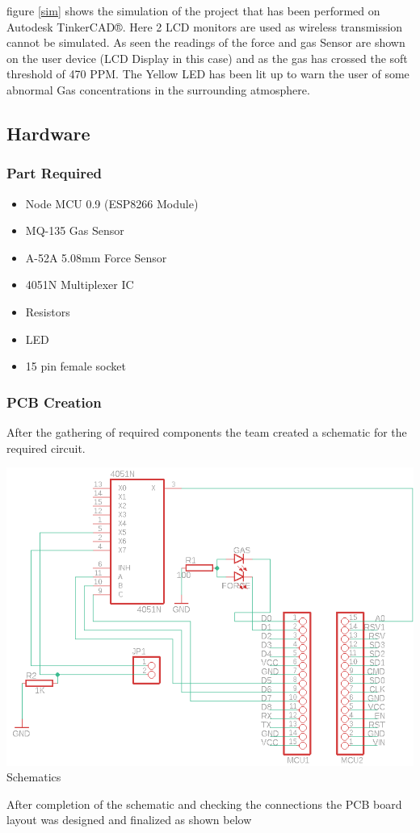 \documentclass[conference]{IEEEtran}
\newenvironment{Figure}
  {\par\medskip\noindent\minipage{\linewidth}}
  {\endminipage\par\medskip}
\begin{document}
figure \ref{sim} shows the simulation of the project that
has been performed on Autodesk TinkerCAD®. Here 2 LCD
monitors are used as wireless transmission cannot be
simulated. As seen the readings of the force and gas
Sensor are shown on the user device (LCD Display in
this case) and as the gas has crossed the soft
threshold of 470 PPM. The Yellow LED has been lit
up to warn the user of some abnormal Gas concentrations
in the surrounding atmosphere.

\subsection{Hardware}
\subsubsection{Part Required}
\begin{itemize}
  \item Node MCU 0.9 (ESP8266 Module)
  \item MQ-135 Gas Sensor
  \item A-52A 5.08mm Force Sensor
  \item 4051N Multiplexer IC
  \item Resistors
  \item LED
  \item 15 pin female socket
\end{itemize}
\subsubsection{PCB Creation}
After the gathering of required components the team created a
schematic for the required circuit.
\begin{Figure}
  \centering
  \includegraphics[width=\linewidth]{Images/Schematic.png}
  \label{scheme}
  \figurename{Schematics}
\end{Figure}
After completion of the schematic and checking the connections the PCB board
layout was designed and finalized as shown below
\end{document}
